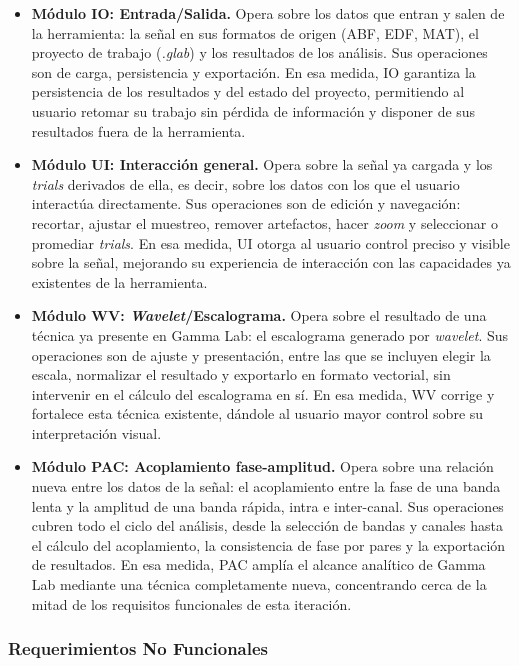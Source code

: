 \documentclass[12pt,letterpaper,oneside]{article}
\begin{document}
\begin{itemize}
    \item \textbf{Módulo IO: Entrada/Salida.} Opera sobre los datos que entran y salen de la herramienta: la señal en sus formatos de origen (ABF, EDF, MAT), el proyecto de trabajo (\textit{.glab}) y los resultados de los análisis. Sus operaciones son de carga, persistencia y exportación. En esa medida, IO garantiza la persistencia de los resultados y del estado del proyecto, permitiendo al usuario retomar su trabajo sin pérdida de información y disponer de sus resultados fuera de la herramienta.

    \item \textbf{Módulo UI: Interacción general.} Opera sobre la señal ya cargada y los \textit{trials} derivados de ella, es decir, sobre los datos con los que el usuario interactúa directamente. Sus operaciones son de edición y navegación: recortar, ajustar el muestreo, remover artefactos, hacer \textit{zoom} y seleccionar o promediar \textit{trials}. En esa medida, UI otorga al usuario control preciso y visible sobre la señal, mejorando su experiencia de interacción con las capacidades ya existentes de la herramienta.

    \item \textbf{Módulo WV: \textit{Wavelet}/Escalograma.} Opera sobre el resultado de una técnica ya presente en Gamma Lab: el escalograma generado por \textit{wavelet}. Sus operaciones son de ajuste y presentación, entre las que se incluyen elegir la escala, normalizar el resultado y exportarlo en formato vectorial, sin intervenir en el cálculo del escalograma en sí. En esa medida, WV corrige y fortalece esta técnica existente, dándole al usuario mayor control sobre su interpretación visual.

    \item \textbf{Módulo PAC: Acoplamiento fase-amplitud.} Opera sobre una relación nueva entre los datos de la señal: el acoplamiento entre la fase de una banda lenta y la amplitud de una banda rápida, intra e inter-canal. Sus operaciones cubren todo el ciclo del análisis, desde la selección de bandas y canales hasta el cálculo del acoplamiento, la consistencia de fase por pares y la exportación de resultados. En esa medida, PAC amplía el alcance analítico de Gamma Lab mediante una técnica completamente nueva, concentrando cerca de la mitad de los requisitos funcionales de esta iteración.
\end{itemize}

\subsubsection{Requerimientos No Funcionales}
\end{document}
